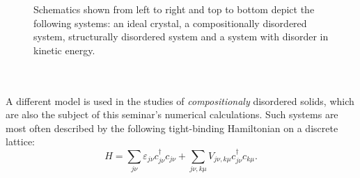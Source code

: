 \documentclass[10pt,a4paper]{article}
\begin{document}
\begin{minipage}[t]{0.38\textwidth}
\begin{figure}[H]
\caption{Schematics shown from left to right and top to bottom depict the following systems: an ideal crystal, a compositionally disordered system, structurally disordered system and a system with disorder in kinetic energy.  }
\label{fig:disorder} 
\end{figure}
\end{minipage} \\\\
\noindent A different model is used in the studies of \emph{compositionaly} disordered solids, which are also the subject of this seminar's numerical calculations. Such systems are most often described by the following tight-binding Hamiltonian on a discrete lattice:
\begin{equation}\label{eq:compositional}
H=\sum\limits_{j\nu}\varepsilon_{j\nu} c^\dagger_{j\nu}c_{j\nu} + \sum\limits_{j\nu,k\mu} V_{j\nu, k\mu}c^\dagger_{j\nu}c_{k\mu}.
\end{equation}
\end{document}
